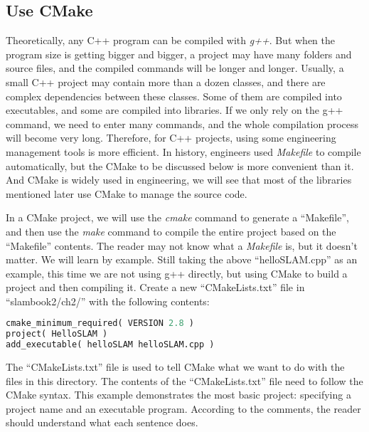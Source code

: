 \subsection{Use CMake}
Theoretically, any C++ program can be compiled with \textit{g++}. But when the program size is getting bigger and bigger, a project may have many folders and source files, and the compiled commands will be longer and longer. Usually, a small C++ project may contain more than a dozen classes, and there are complex dependencies between these classes. Some of them are compiled into executables, and some are compiled into libraries. If we only rely on the g++ command, we need to enter many commands, and the whole compilation process will become very long. Therefore, for C++ projects, using some engineering management tools is more efficient. In history, engineers used \textit{Makefile} to compile automatically, but the CMake to be discussed below is more convenient than it. And CMake is widely used in engineering, we will see that most of the libraries mentioned later use CMake to manage the source code.

In a CMake project, we will use the \textit{cmake} command to generate a ``Makefile'', and then use the \textit{make} command to compile the entire project based on the ``Makefile'' contents. The reader may not know what a \textit{Makefile} is, but it doesn't matter. We will learn by example. Still taking the above ``helloSLAM.cpp'' as an example, this time we are not using g++ directly, but using CMake to build a project and then compiling it. Create a new ``CMakeLists.txt'' file in ``slambook2/ch2/'' with the following contents:
\begin{lstlisting}[language=Python,caption=slambook2/ch2/CMakeLists.txt]
cmake_minimum_required( VERSION 2.8 )
project( HelloSLAM )
add_executable( helloSLAM helloSLAM.cpp )
\end{lstlisting}

The ``CMakeLists.txt'' file is used to tell CMake what we want to do with the files in this directory. The contents of the ``CMakeLists.txt'' file need to follow the CMake syntax.  This example demonstrates the most basic project: specifying a project name and an executable program. According to the comments, the reader should understand what each sentence does.

